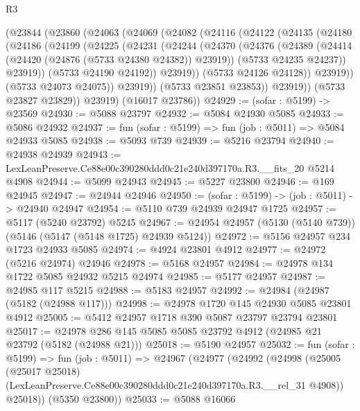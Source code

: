 \begin{lexlean}{R3}
\begin{coremodule}
      (@23844
        (@23860
          (@24063
            (@24069
              (@24082
                (@24116
                  (@24122
                    (@24135
                      (@24180
                        (@24186
                          (@24199
                            (@24225
                              (@24231
                                (@24244
                                  (@24370
                                    (@24376
                                      (@24389
                                        (@24414 (@24420 (@24876 (@5733 @24380 @24382)) @23919))
                                        (@5733 @24235 @24237))
                                      @23919))
                                  (@5733 @24190 @24192))
                                @23919))
                            (@5733 @24126 @24128))
                          @23919))
                      (@5733 @24073 @24075))
                    @23919))
                (@5733 @23851 @23853))
              @23919))
          (@5733 @23827 @23829))
        @23919)
      (@16017 @23786))
@24929 := (sofar : @5199) -> @23569
@24930 := @5088 @23797
@24932 := @5084 @24930 @5085
@24933 := @5086 @24932
@24937 := fun (sofar : @5199) => fun (job : @5011) => @5084 @24933 @5085
@24938 := @5093 @739
@24939 := @5216 @23794
@24940 := @24938 @24939
@24943 := LexLeanPreserve.Ce88e00c390280ddd0c21e240d397170a.R3.__fits_20 @5214 @4908
@24944 := @5099 @24943
@24945 := @5227 @23800
@24946 := @169 @24945
@24947 := @24944 @24946
@24950 := (sofar : @5199) -> (job : @5011) -> @24940 @24947
@24954 := @5110 @739 @24939 @24947 @1725
@24957 := @5117 (@5240 @23792) @5245
@24967 := @24954 @24957 (@5130 (@5140 @739)) (@5146 (@5147 (@5148 @1725) @24939 @5124))
@24972 := @5156 @24957 @234 @1723 @24933 @5085
@24974 := @4924 @23801 @4912
@24977 := @24972 (@5216 @24974) @24946
@24978 := @5168 @24957
@24984 := @24978 @134 @1722 @5085 @24932 @5215 @24974
@24985 := @5177 @24957
@24987 := @24985 @117 @5215
@24988 := @5183 @24957
@24992 := @24984 (@24987 (@5182 (@24988 @117)))
@24998 := @24978 @1720 @145 @24930 @5085 @23801 @4912
@25005 := @5412 @24957 @1718 @390 @5087 @23797 @23794 @23801
@25017 := @24978 @286 @145 @5085 @5085 @23792 @4912 (@24985 @21 @23792 (@5182 (@24988 @21)))
@25018 := @5190 @24957
@25032 := fun (sofar : @5199) =>
  fun (job : @5011) =>
  @24967
    (@24977
      (@24992
        (@24998
          (@25005
            (@25017 @25018)
            (LexLeanPreserve.Ce88e00c390280ddd0c21e240d397170a.R3.__rel_31 @4908))
          @25018))
      (@5350 @23800))
@25033 := @5088 @16066

\end{coremodule}
\end{lexlean}
